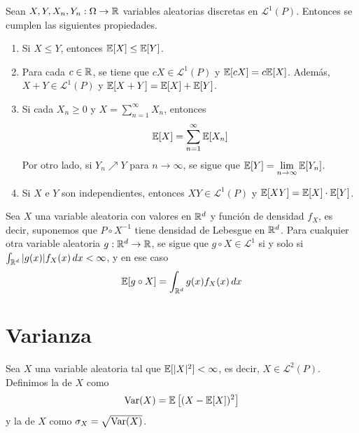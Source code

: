 \begin{teo}
    Sean $X, Y, X_n, Y_n : \Omega \to \mathbb{R}$ variables aleatorias discretas en $\mathcal{L}^1(P)$. Entonces se cumplen las siguientes propiedades.
    \begin{enumerate}[label=(\alph*)]
        \item {} Si $X \leq Y$, entonces $\mathbb{E}[X] \leq \mathbb{E}[Y]$.
        \item {} Para cada $c\in \mathbb{R}$, se tiene que $cX \in \mathcal{L}^1(P)$ y $\mathbb{E}[cX] = c \mathbb{E}[X]$. Además, $X+Y \in \mathcal{L}^1(P)$ y $\mathbb{E}[X+Y] = \mathbb{E}[X] + \mathbb{E}[Y]$.
        \item {} Si cada $X_n \geq 0$ y $X = \sum\limits_{n=1}^{\infty} X_n$, entonces 
        \begin{equation*}
            \mathbb{E}[X] = \sum\limits_{n=1}^{\infty} \mathbb{E}[X_n]
        \end{equation*}
        Por otro lado, si $Y_n \nearrow Y$ para $n \to \infty$, se sigue que $\mathbb{E}[Y] = \lim\limits_{n\to \infty} \mathbb{E}[Y_n]$.
        \item {} Si $X$ e $Y$ son independientes, entonces $XY \in \mathcal{L}^1(P)$ y $\mathbb{E}[XY] = \mathbb{E}[X] \cdot \mathbb{E}[Y]$.
    \end{enumerate}
\end{teo}

\begin{prop}
    Sea $X$ una variable aleatoria con valores en $\mathbb{R}^d$ y función de densidad $f_X$, es decir, suponemos que $P \circ X^{-1}$ tiene densidad de Lebesgue en $\mathbb{R}^d$. Para cualquier otra variable aleatoria $g:\mathbb{R}^d \to \mathbb{R}$, se sigue que $g \circ X \in \mathcal{L}^1$ si y solo si $\int_{\mathbb{R}^d} |g(x)| f_X(x) \, dx < \infty$, y en ese caso
    \begin{equation*}
        \mathbb{E}[g \circ X] = \int_{\mathbb{R}^d} g(x) f_X(x) \, dx
    \end{equation*}
\end{prop}


\section{Varianza}

\begin{definicion}
    Sea $X$ una variable aleatoria tal que \mbox{$\mathbb{E}[|X|^2] < \infty$}, es decir, $X \in \mathcal{L}^2(P)$. Definimos la  de $X$ como
    \begin{equation*}
        \operatorname{Var}(X) = \mathbb{E}\left[ (X - \mathbb{E}[X])^2 \right]
    \end{equation*}
    y la  de $X$ como $\sigma_X = \sqrt{\operatorname{Var}(X)}$.
\end{definicion}

